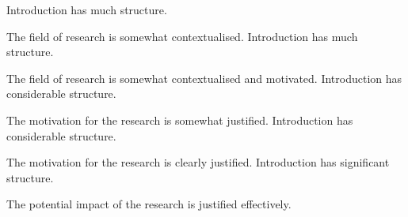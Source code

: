 \begin{markingrubric}
        \grade \fail 
      \grade Introduction has much structure.
        	\par The field of research is somewhat contextualised.
      \grade Introduction has much structure.
        	\par The field of research is somewhat contextualised and motivated.	      	
       \grade Introduction has considerable structure.
        	\par The motivation for the research is somewhat justified.	  
      \grade Introduction has considerable structure.
        	\par The motivation for the research is clearly justified.	 	      	
       \grade Introduction has significant structure.
        	\par The potential impact of the research is justified effectively.
        		

\end{markingrubric}
